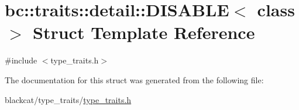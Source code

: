 \hypertarget{structbc_1_1traits_1_1detail_1_1DISABLE}{}\section{bc\+:\+:traits\+:\+:detail\+:\+:D\+I\+S\+A\+B\+LE$<$ class $>$ Struct Template Reference}
\label{structbc_1_1traits_1_1detail_1_1DISABLE}


{\ttfamily \#include $<$type\+\_\+traits.\+h$>$}



The documentation for this struct was generated from the following file\+:\begin{DoxyCompactItemize}
\item 
blackcat/type\+\_\+traits/\hyperlink{type__traits_2type__traits_8h}{type\+\_\+traits.\+h}\end{DoxyCompactItemize}
